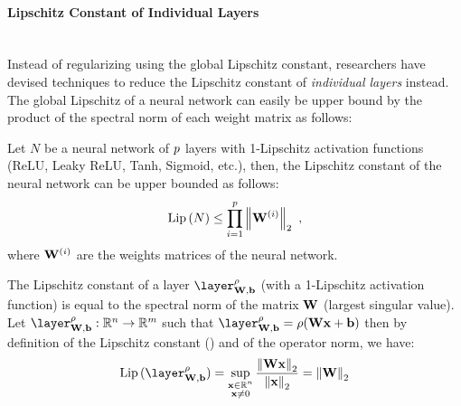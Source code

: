 \paragraph{Lipschitz Constant of Individual Layers} ~\\

\noindent
Instead of regularizing using the global Lipschitz constant, researchers have devised techniques to reduce the Lipschitz constant of \emph{individual layers} instead. 
The global Lipschitz of a neural network can easily be upper bound by the product of the spectral norm of each weight matrix as follows:
\begin{proposition} \label{proposition:ch3-naive_upper_bound_lipschitz}
  Let $N$ be a neural network of $p$ layers with 1-Lipschitz activation functions (\eg ReLU,
  Leaky ReLU, Tanh, Sigmoid, etc.), then, the Lipschitz constant of the neural network can be upper bounded as follows:
  \begin{equation} \label{equation:ch3-naive_upper_bound_lipschitz}
    \operatorname{Lip}{(N)} \leq \prod_{i=1}^p \norm{\mathbf{W}^{(i)}}_2 \enspace,
  \end{equation}
  where $\mathbf{W}^{(i)}$ are the weights matrices of the neural network.
\end{proposition}

\begin{remark}
  The Lipschitz constant of a layer $\layer_{\Wmat, \bvec}^\rho$ (with a 1-Lipschitz activation function) is equal to the spectral norm of the matrix $\mathbf{W}$ (largest singular value).
  Let $\layer_{\Wmat, \bvec}^\rho: \Rbb^n \rightarrow \Rbb^m$ such that $\layer_{\Wmat, \bvec}^\rho = \rho(\Wmat \xvec + \bvec)$ then by definition of the Lipschitz constant () and of the operator norm, we have:
  \begin{equation}
    \lip{\layer_{\Wmat, \bvec}^\rho} = \sup_{\substack{\xvec \in \Rbb^n \\ \xvec \neq 0}} \frac{\norm{\Wmat \xvec}_2}{\norm{\xvec}_2} = \norm{\Wmat}_2
  \end{equation}
  \removespace
\end{remark}

